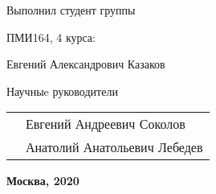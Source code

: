 \begin{titlepage}
	\begin{flushleft}
	Выполнил студент группы
	
    ПМИ164, 4 курса:
	\end{flushleft}
	
	\begin{flushright}
	    Евгений Александрович Казаков
	\end{flushright}
	
	\begin{flushleft}
	Научныe руководители
	\end{flushleft}
	
	\begin{flushright}
		\begin{tabular}{rl}
			 & Евгений Андреевич Соколов \\
			 & Анатолий Анатольевич Лебедев \\
		\end{tabular}
	\end{flushright}

\vspace{40pt}
	\begin{center} %
		\bfseries
		Москва, 2020
	\end{center}

	
\end{titlepage} 

